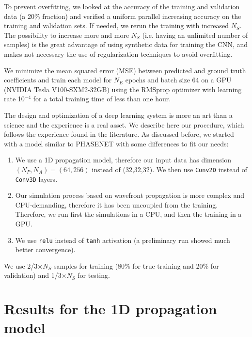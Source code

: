 \documentclass{iucr}
\begin{document}
To prevent overfitting, we looked at the accuracy of the training and validation data (a 20\% fraction) and verified a uniform parallel increasing accuracy on the training and validation sets. If needed, we rerun the training with increased $N_S$. The possibility to increase more and more $N_S$ (i.e. having an unlimited number of samples) is the great advantage of using synthetic data for training the CNN, and makes not necessary the use of regularization techniques to avoid overfitting.

We minimize the mean squared error (MSE) between predicted and ground truth coefficients and train each model for $N_E$ epochs and batch size 64 on a GPU (NVIDIA Tesla V100-SXM2-32GB) using the RMSprop optimizer with learning rate 10$^{-4}$ for a total training time of less than one hour.

The design and optimization of a deep learning system is more an art than a science \cite{chollet_book} and the experience is a real asset. We describe here our procedure, which follows the experience found in the literature. As discussed before, we started with a model similar to PHASENET \cite{Saha2020} with some differences to fit our needs: 
\begin{enumerate}
    \item We use a 1D propagation model, therefore our input data has dimension $(N_P,N_A)=(64,256)$ instead of (32,32,32). We then use \texttt{Conv2D} instead of \texttt{Conv3D} layers. 
    \item Our simulation process based on wavefront propagation is more complex and CPU-demanding, therefore it has been uncoupled from the training. Therefore, we run first the simulations in a CPU, and then the training in a GPU.
    \item We use \texttt{relu} instead of \texttt{tanh} activation (a preliminary run showed much better convergence). 
\end{enumerate}

 We use 2/3$\times N_S$ samples for training (80\% for true training and 20\% for validation) and 1/3$\times N_S$ for testing. 

\section{Results for the 1D propagation model}\label{sec:results}
\end{document}
